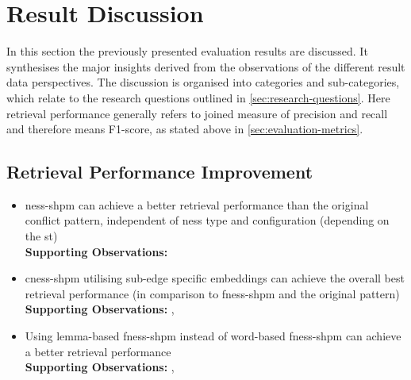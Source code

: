 \documentclass[11pt]{scrreprt}
\newcounter{listcounter}
\begin{document}
{\begin{enumerate}[label=\arabic{listcounter}.\arabic*]
\end{enumerate}


\section{Result Discussion}
\label{sec:result-discussion}
In this section the previously presented evaluation results are discussed. It synthesises the major insights derived from the observations of the different result data perspectives. The discussion is organised into categories and sub-categories, which relate to the research questions outlined in \cref{sec:research-questions}. Here retrieval performance generally refers to joined measure of precision and recall and therefore means F1-score, as stated above in \cref{sec:evaluation-metrics}. 


\subsection{Retrieval Performance Improvement}
\label{sec:result-retrieval-performance-improvement}

\begin{itemize}

\item \gls{ness-shpm} can achieve a better retrieval performance than the original conflict pattern, independent of \gls{ness} type and configuration (depending on the \gls{st}) \\
\textbf{Supporting Observations:} 

\item \gls{cness-shpm} utilising sub-edge specific embeddings can achieve the overall best retrieval performance (in comparison to \gls{fness-shpm} and the original pattern) \\
\textbf{Supporting Observations:} , 

\item Using lemma-based \gls{fness-shpm} instead of word-based \gls{fness-shpm} can achieve a better retrieval performance \\
\textbf{Supporting Observations:} , 


\end{itemize}}
\end{document}
